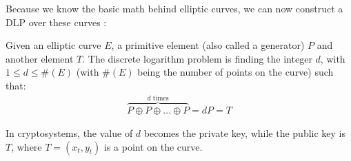 Because we know the basic math behind elliptic curves, we can now construct a DLP over these curves \cite{paar2009understanding}:
%
\begin{definition}
Given an elliptic curve $E$, a primitive element (also called a generator) $P$ and another element $T$. 
The discrete logarithm problem is finding the integer $d$, with $1 \le d \le \#(E)$ (with $\#(E)$ being the number of points on the curve) such that:
%
\begin{align*}
\overbrace{P \oplus P \oplus \ldots \oplus P}^{d \text{ times}} = dP = T
\end{align*}
%
\end{definition}
%
In cryptosystems, the value of $d$ becomes the private key, while the public key is $T$, where $T=(x_t, y_t)$ is a point on the curve.


